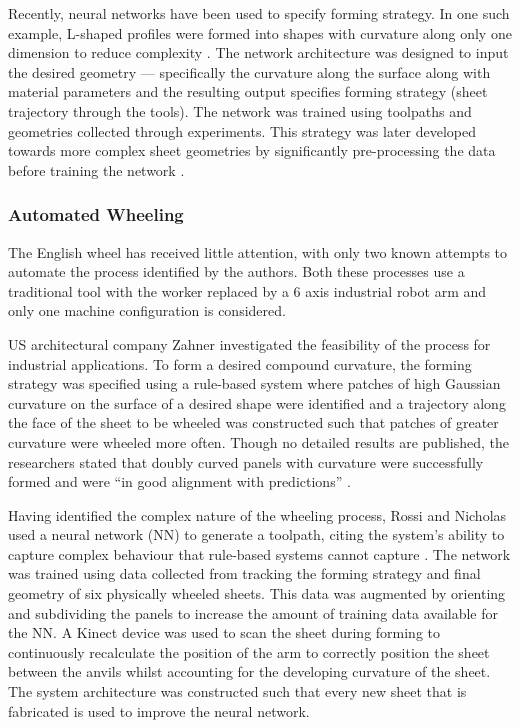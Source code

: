 Recently, neural networks have been used to specify forming strategy. In one such example, L-shaped profiles were formed into shapes with curvature along only one dimension to reduce complexity \citep{Opritescu2015AutomatedApproach}. The network architecture was designed to input the desired geometry --- specifically the curvature along the surface along with material parameters and the resulting output specifies forming strategy (sheet trajectory through the tools). The network was trained using toolpaths and geometries collected through experiments. This strategy was later developed towards more complex sheet geometries by significantly pre-processing the data before training the network \citep{Hartmann2019AnFree-forming}.

\subsubsection{Automated Wheeling} \label{sec:MechEW}
The English wheel has received little attention, with only two known attempts to automate the process identified by the authors. Both these processes use a traditional tool with the worker replaced by a 6 axis industrial robot arm and only one machine configuration is considered. 

US architectural company Zahner investigated the feasibility of the process for industrial applications. To form a desired compound curvature, the forming strategy was specified using a rule-based system where patches of high Gaussian curvature on the surface of a desired shape were identified and a trajectory along the face of the sheet to be wheeled was constructed such that patches of greater curvature were wheeled more often. Though no detailed results are published, the researchers stated that doubly curved panels with curvature were successfully formed and were ``in good alignment with predictions'' \citep{Vazquez2017RoboticWheeling}. 

Having identified the complex nature of the wheeling process, Rossi and Nicholas used a neural network (NN) to generate a toolpath, citing the system's ability to capture complex behaviour that rule-based systems cannot capture \citep{Rossi2018ModellingWheel, Rossi2018Re/LearningSurfaces}. The network was trained using data collected from tracking the forming strategy and final geometry of six physically wheeled sheets. This data was augmented by orienting and subdividing the panels to increase the amount of training data available for the NN. A Kinect device was used to scan the sheet during forming to continuously recalculate the position of the arm to correctly position the sheet between the anvils whilst accounting for the developing curvature of the sheet. The system architecture was constructed such that every new sheet that is fabricated is used to improve the neural network.

